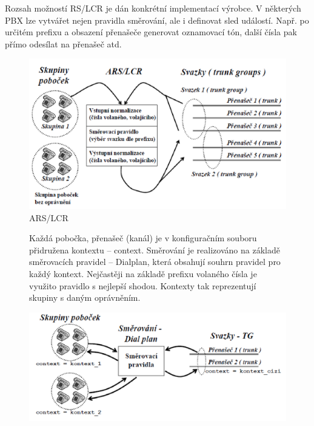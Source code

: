 Rozsah možností RS/LCR je dán konkrétní implementací výrobce. V některých PBX lze vytvářet nejen pravidla směrování, ale i definovat sled událostí. Např. po určitém prefixu a obsazení přenašeče generovat oznamovací tón, další čísla pak přímo odesílat na přenašeč atd.


\begin{figure}[h!]
    \begin{center}
        \includegraphics[width=\textwidth]{images/otazka5.png}
        \caption{ARS/LCR}
        \label{img:2}
    \end{center}
\end{figure}


\begin{figure}[ht]
    \begin{center}
        \begin{minipage}[c]{0.35\textwidth}
            Každá pobočka, přenašeč (kanál) je v konfiguračním souboru přidružena kontextu -- context. Směrování je realizováno na základě směrovacích pravidel -- Dialplan, která obsahují souhrn pravidel pro každý kontext. Nejčastěji na základě prefixu volaného čísla je využito pravidlo s nejlepší shodou. Kontexty tak reprezentují skupiny s daným oprávněním.
        \end{minipage}%
        \hspace*{0.05\textwidth}%
        \begin{minipage}[c]{0.60\textwidth}
            \centering\includegraphics[width=\textwidth]{images/otazka6.png}
        \end{minipage}
\end{center}
\end{figure}

